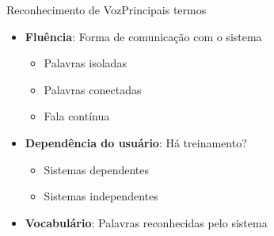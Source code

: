 \begin{frame}{Reconhecimento de Voz}{Principais termos}

\begin{itemize}
\item \textbf{Fluência}: Forma de comunicação com o sistema
\begin{itemize}
  \item Palavras isoladas
  \item Palavras conectadas
  \item Fala contínua
\end{itemize}

\item<2-> \textbf{Dependência do usuário}: Há treinamento?
\begin{itemize}
  \item Sistemas dependentes
  \item Sistemas independentes
\end{itemize}

\item<3-> \textbf{Vocabulário}: Palavras reconhecidas pelo sistema
\end{itemize}
\end{frame}
